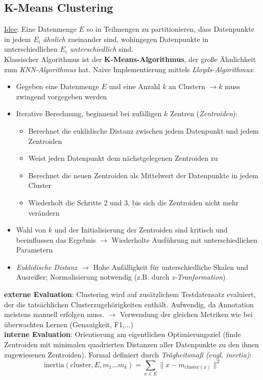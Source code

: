 \subsection{K-Means Clustering}
\label{kmeans}
\underline{Idee}: Eine Datenmenge $E$ so in Teilmengen zu partitionieren, dass Datenpunkte in jedem $E_i$ \emph{ähnlich} zueinander sind, wohingegen Datenpunkte in unterschiedlichen $E_i$ \emph{unterschiedlich} sind.\\

Klassischer Algorithmus ist der \textbf{K-Means-Algorithmus}, der große Ähnlichkeit zum \emph{KNN-Algorithmus} hat. Naive Implementierung mittels \emph{Lloyds-Algorithmus}:

\begin{itemize}
    \item Gegeben eine Datenmenge $E$ und eine Anzahl $k$ an Clustern $\rightarrow k$ muss zwingend vorgegeben werden
    \item Iterative Berechnung, beginnend bei zufälligen $k$ Zentren (\emph{Zentroiden}):
    \begin{itemize}
        \item Berechnet die euklidische Distanz zwischen jedem Datenpunkt und jedem Zentroiden
        \item Weist jeden Datenpunkt dem nächstgelegenen Zentroiden zu
        \item Berechnet die neuen Zentroiden als Mittelwert der Datenpunkte in jedem Cluster
        \item Wiederholt die Schritte 2 und 3, bis sich die Zentroiden nicht mehr verändern
    \end{itemize}
    \item Wahl von $k$ und der Initialisierung der Zentroiden sind kritisch und beeinflussen das Ergebnis $\rightarrow$ Wiederholte Ausführung mit unterschiedlichen Parametern
    \item \emph{Euklidische Distanz} $\rightarrow$ Hohe Anfälligkeit für unterschiedliche Skalen und Ausreißer; Normalisierung notwendig (z.B. durch \emph{z-Tranformation})
\end{itemize}

\textbf{externe Evaluation}: Clustering wird auf zusätzlichem Testdatensatz evaluiert, der die tatsächlichen Clusterzugehörigkeiten enthält. Aufwendig, da Annotation meistens manuell erfolgen muss. $\rightarrow$ Verwendung der gleichen Metriken wie bei überwachten Lernen (Genauigkeit, F1,...)\\

\textbf{interne Evaluation}: Orientierung am eigentlichen Optimierungsziel (finde Zentroiden mit minimalen quadrierten Distanzen aller Datenpunkte zu den ihnen zugewiesenen Zentroiden). Formal definiert durch \emph{Trägheitsmaß (engl. inertia)}:\\
\begin{equation*}
    \text{inertia}(\text{cluster}, E, m_1\dots m_k)=\sum_{x\in E}\|x-m_{\text{cluster}(x)}\|^2    
\end{equation*}

